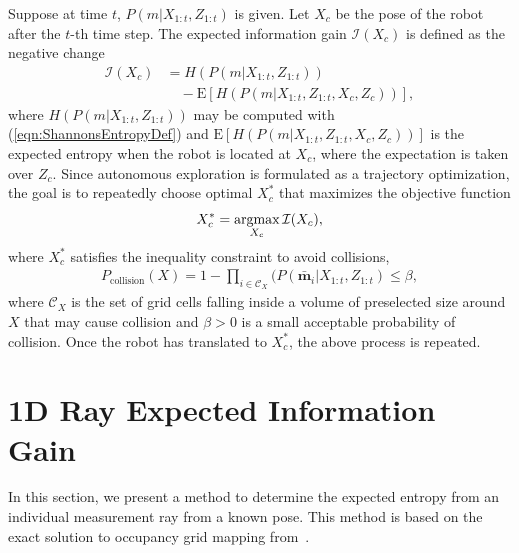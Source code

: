 \documentclass[letterpaper, 10pt, conference]{ieeeconf}
\newcommand{\refeqn}[1]{(\ref{eqn:#1})}
\newcommand{\argmax}{\operatornamewithlimits{argmax}}
\begin{document}
Suppose at time $t$, $P(m|X_{1:t},Z_{1:t})$ is given. Let $X_c$ be the pose of the robot after the $t$-th time step.
The expected information gain $\mathcal I(X_c)$ is defined as the negative change
\begin{align}
\label{eqn:ObjFun}
\mathcal I(X_c)&=H(P(m|X_{1:t},Z_{1:t}))\nonumber\\&\quad-\text{E}\left[H(P(m|X_{1:t},Z_{1:t},X_c,Z_c))\right],
\end{align}
where $H(P(m|X_{1:t},Z_{1:t}))$ may be computed with \refeqn{ShannonsEntropyDef} and $\text{E}\left[H(P(m|X_{1:t},Z_{1:t},X_c,Z_c))\right]$ is the expected entropy when the robot is located at $X_c$, where the expectation is taken over $Z_c$.
Since autonomous exploration is formulated as a trajectory optimization, the goal is to repeatedly choose optimal $X_c^*$ that maximizes the objective function
\begin{align}
\label{eqn:Objective}
X_c^*=\argmax_{X_c}{\mathcal I(X_c)},
\end{align}
where $X_c^*$ satisfies the inequality constraint to avoid collisions,
\begin{align}
\label{eqn:CollisionInequalityConstraint}
P_\text{collision}(X)=1-\prod_{i\in\mathcal C_X}(P(\bar{\mathbf{m}}_i|X_{1:t},Z_{1:t})\leq\beta,
\end{align}
where $\mathcal C_X$ is the set of grid cells falling inside a volume of preselected size around $X$ that may cause collision and $\beta>0$ is a small acceptable probability of collision.
Once the robot has translated to $X_c^*$, the above process is repeated.


\section{1D Ray Expected Information Gain}

In this section, we present a method to determine the expected entropy from an individual measurement ray from a known pose. This method is based on the exact solution to occupancy grid mapping from~\cite{KauLeeAiMos16}.
\end{document}
